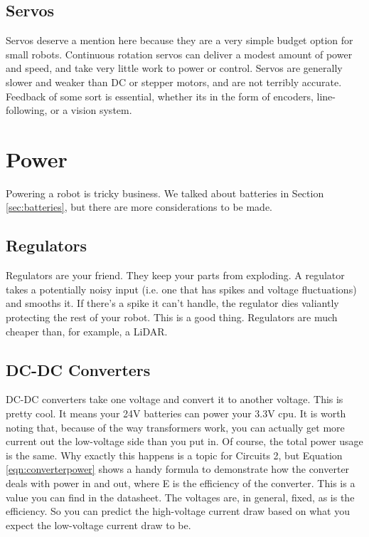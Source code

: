 \subsection{Servos}

Servos deserve a mention here because they are a very simple budget option for small robots. Continuous rotation servos can deliver a modest amount of power and speed, and take very little work to power or control. Servos are generally slower and weaker than DC or stepper motors, and are not terribly accurate. Feedback of some sort is essential, whether its in the form of encoders, line-following, or a vision system.

\section{Power}

Powering a robot is tricky business. We talked about batteries in Section \ref{sec:batteries}, but there are more considerations to be made.

\subsection{Regulators}
\label{sec:regulators}

Regulators are your friend. They keep your parts from exploding. A regulator takes a potentially noisy input (i.e. one that has spikes and voltage fluctuations) and smooths it. If there's a spike it can't handle, the regulator dies valiantly protecting the rest of your robot. This is a good thing. Regulators are much cheaper than, for example, a LiDAR.

\subsection{DC-DC Converters}

DC-DC converters take one voltage and convert it to another voltage. This is pretty cool. It means your 24V batteries can power your 3.3V cpu. It is worth noting that, because of the way transformers work, you can actually get more current out the low-voltage side than you put in. Of course, the total power usage is the same. Why exactly this happens is a topic for Circuits 2, but Equation \ref{eqn:converterpower} shows a handy formula to demonstrate how the converter deals with power in and out, where E is the efficiency of the converter. This is a value you can find in the datasheet. The voltages are, in general, fixed, as is the efficiency. So you can predict the high-voltage current draw based on what you expect the low-voltage current draw to be.

